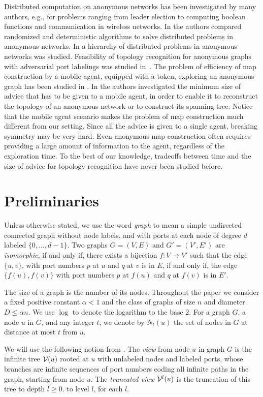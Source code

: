 \documentclass{article}
\newcommand{\cV}{{\cal V}}
\begin{document}
Distributed computation on anonymous networks has been investigated by many authors, e.g.,
\cite{An,ASW,BV,EPSW,ESW,FP2, KKV,Pe,YK3}
for problems ranging from leader election to computing boolean functions
and communication in wireless networks. 
In \cite{EPSW} the authors compared randomized and deterministic algorithms to solve distributed problems in anonymous networks.
In \cite{ESW} a hierarchy of distributed problems in anonymous networks was studied.
Feasibility of topology recognition for anonymous graphs with adversarial port labelings was studied in~\cite{YK3}.
The problem of efficiency of map construction by a mobile agent, equipped with a token, exploring an anonymous graph  has
been studied in \cite{CDK}. In \cite{DP} the authors investigated the minimum size of advice
that has to be given to a mobile agent, in order to enable it to reconstruct  the topology of an anonymous network or to construct its spanning tree.
Notice that the mobile agent scenario makes the problem of map construction much different from our setting. Since all the advice is given to a single agent,
breaking symmetry may be very hard. Even anonymous map construction often requires providing a large amount of information to the agent, regardless of the exploration time. 
To the best of our knowledge, tradeoffs between time and the size of advice for topology recognition have never been studied before.

\section{Preliminaries}
Unless otherwise stated, we use the word {\em graph} to mean a simple undirected connected graph without node labels, and with ports at each node of degree $d$ labeled $\{0,\ldots,d-1\}$. 
Two graphs $G=(V,E)$ and $G'=(V',E')$ are {\em isomorphic}, if and only if, there exists a bijection $f: V \longrightarrow V'$ such that the edge
$\{u,v\}$, with port numbers $p$ at $u$ and $q$ at $v$ is in $E$, if and only if, the edge $\{f(u),f(v)\}$ with port numbers $p$ at $f(u)$ and $q$ at $f(v)$ is in $E'$.

The size of a graph is the number of its nodes. Throughout the paper we consider a fixed positive constant $\alpha < 1$ and the class of graphs of size $n$ and diameter $D\le \alpha n$. We use $\log$ to denote the logarithm to the base $2$.
For a graph $G$, a node $u$ in $G$, and any integer $t$, we denote by $N_t(u)$ the set of nodes in $G$ at distance at most $t$ from $u$.


We will use the following notion from \cite{YK3}. 
The {\em view} from node $u$ in graph $G$ is the infinite tree $\cV(u)$  rooted at $u$ with unlabeled nodes and labeled ports, whose branches are infinite sequences of port numbers coding all infinite paths in the graph, starting from node $u$. The {\em truncated view} $\cV^{l}(u)$ is the truncation of this tree to depth $l \geq 0$. to level $l$, for each $l$.
 
\end{document}

